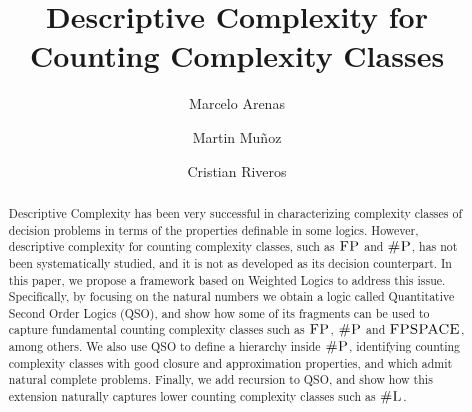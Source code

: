 \documentclass{lmcs} %
\theoremstyle{plain}\newtheorem{satz}[thm]{Satz} %
\def\eg{{\em e.g.}}
\begin{document}
\title[Descriptive Complexity for Counting Complexity Classes]{Descriptive Complexity for Counting Complexity Classes}

\author[M.~Arenas]{Marcelo Arenas}	%
\address{Pontificia Universidad Cat\'olica de Chile}	%

\author[M.~Munoz]{Martin Mu\~noz}	%
\address{Pontificia Universidad Cat\'olica de Chile}	%

\author[C.~Riveros]{Cristian Riveros}	%
\address{Pontificia Universidad Cat\'olica de Chile}	%





\begin{abstract}
  \noindent Descriptive Complexity has been very successful in characterizing complexity classes of decision problems in terms of the properties definable in some logics. However, descriptive complexity for counting complexity classes, such as $\text{\sc FP}$ and $\text{\sc \#P}$, has not been systematically studied, and it is not as developed as its decision counterpart. In this paper, we propose a framework based on Weighted Logics to address this issue. Specifically, by focusing on the natural numbers we obtain a logic called Quantitative Second Order Logics (QSO), and show how some of its fragments can be used to capture fundamental counting complexity classes such as $\text{\sc FP}$, $\text{\sc \#P}$ and $\text{\sc FPSPACE}$, among others. We also use QSO to define a hierarchy inside $\text{\sc \#P}$, identifying counting complexity classes with good closure and approximation properties, and which admit natural complete problems. Finally, we add recursion to QSO, and show how this extension naturally captures lower counting complexity classes such as $\text{\sc \#L}$.
\end{abstract}
\end{document}

